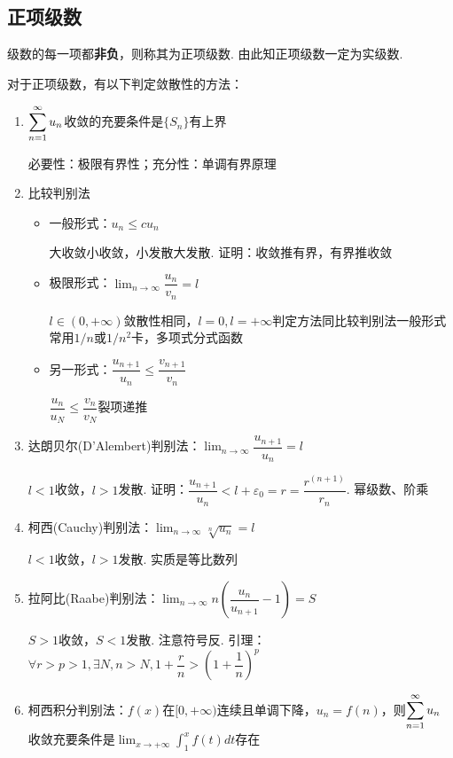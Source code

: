 \subsection{正项级数}
\begin{definition}[正项级数]
级数的每一项都\textbf{非负}，则称其为正项级数. 由此知正项级数一定为实级数.
\end{definition}
对于正项级数，有以下判定敛散性的方法：
\begin{enumerate}
	\itemsep -3pt
	\item $\displaystyle\sum_{n=1}^{\infty}u_n$收敛的充要条件是$\{S_n\}$有上界
	\begin{analysis}
		必要性：极限有界性；充分性：单调有界原理
	\end{analysis}
	\item 比较判别法
	\begin{itemize}
		\itemsep -3pt
		\item 一般形式：$u_n\leq cu_n$
		\begin{analysis}
			大收敛小收敛，小发散大发散. 证明：收敛推有界，有界推收敛
		\end{analysis}
		\item 极限形式：$\displaystyle\lim_{n\to\infty}\dfrac{u_n}{v_n}=l$
		\begin{analysis}
			$l\in(0,+\infty)$敛散性相同，$l=0,l=+\infty$判定方法同比较判别法一般形式\\
			常用$1/n$或$1/n^2$卡，多项式分式函数
		\end{analysis}
		\item 另一形式：$\dfrac{u_{n+1}}{u_n}\leq\dfrac{v_{n+1}}{v_n}$
		\begin{analysis}
			$\dfrac{u_n}{u_N}\leq\dfrac{v_n}{v_N}$裂项递推
		\end{analysis}
	\end{itemize}
	\item 达朗贝尔(D'Alembert)判别法：$\displaystyle\lim_{n\to\infty}\dfrac{u_{n+1}}{u_n}=l$
	\begin{analysis}
		$l<1$收敛，$l>1$发散. 证明：$\dfrac{u_{n+1}}{u_n}<l+\varepsilon_0=r=\dfrac{r^{(n+1)}}{r_n}$. 幂级数、阶乘
	\end{analysis}
	\item 柯西(Cauchy)判别法：$\displaystyle\lim_{n\to\infty}\sqrt[n]{u_n}=l$
	\begin{analysis}
		$l<1$收敛，$l>1$发散. 实质是等比数列
	\end{analysis}
	\item 拉阿比(Raabe)判别法：$\displaystyle\lim_{n\to\infty}n\left(\dfrac{u_n}{u_{n+1}}-1\right)=S$
	\begin{analysis}
		$S>1$收敛，$S<1$发散. 注意符号反. 引理：$\forall r>p>1,\exists N, n>N, 1+\dfrac{r}{n}>\left(1+\dfrac{1}{n}\right)^p$
	\end{analysis}
	\item 柯西积分判别法：$f(x)$在$[0,+\infty)$连续且单调下降，$u_n=f(n)$，则$\displaystyle\sum_{n=1}^{\infty}u_n$收敛充要条件是$\displaystyle\lim_{x\to+\infty}\int_1^xf(t)dt$存在
\end{enumerate}

